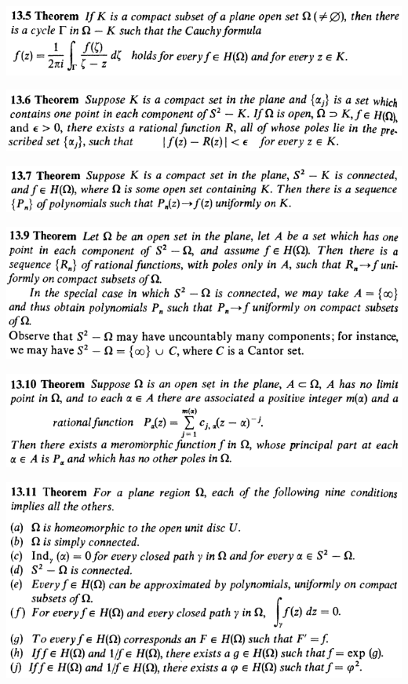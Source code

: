 \documentclass[12pt]{article}
\begin{document}
		\begin{center}
		\includegraphics{13ponto5}
		\end{center}

		\begin{center}
		\includegraphics{13ponto6}
		\end{center}

		\begin{center}
		\includegraphics{13ponto7}
		\end{center}

		\begin{center}
		\includegraphics{13ponto9}
		\end{center}

		\begin{center}
		\includegraphics{13ponto10}
		\end{center}

		\begin{center}
		\includegraphics{13ponto11}
		\end{center}
\end{document}
